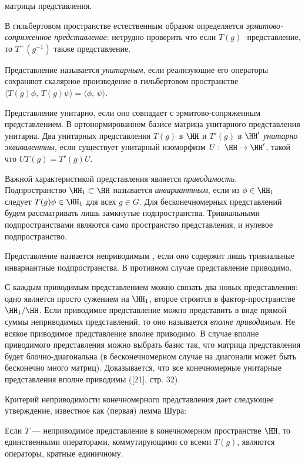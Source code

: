 \documentclass[a4paper
]{article}
\begin{document}
матрицы представления.
\par
В гильбертовом пространстве естественным образом определяется {\em
эрмитово-сопряженное представление}: нетрудно проверить что если
$T(g)$ -представление, то $T^+(g^{-1})$ также
представление.\begin{Def} Представление называется {\em унитарным},
если реализующие его операторы сохраняют скалярное произведение в
гильбертовом пространстве $\langle
T(g)\phi,\,T(g)\psi\rangle=\langle\phi,\,\psi\rangle$.\end{Def}
\noindent Представление унитарно, если оно совпадает с
эрмитово-сопряженным представлением. В ортонормированном базисе
матрица унитарного представления унитарна.  Два унитарных
представления $T(g)$ в $\HH$ и $T'(g)$ в $\HH'$ {\em унитарно
эквивалентны}, если существует унитарный изоморфизм $U:\; \HH\to
\HH'$, такой что $UT(g)=T'(g)U$.
\par
Важной характеристикой представления является {\em приводимость}.
Подпространство $\HH_1\subset\HH$ называется {\em инвариантным},
если из $\phi\in \HH_1$ следует $T(g)\phi \in \HH_1$ для всех
$g\in G$. Для бесконечномерных представлений будем рассматривать
лишь замкнутые подпространства. Тривиальными подпространствами
являются само пространство представления, и нулевое
подпространство. \begin{Def} Представление назвается неприводимым
, если оно содержит лишь тривиальные инвариантные подпространства.
В противном случае представление  приводимо.\end{Def} С каждым
приводимым представлением можно связать два новых представления:
одно является просто сужением на $\HH_1$, второе строится в
фактор-пространстве $\HH_1/\HH$. Если приводимое представление
можно представить в виде прямой суммы неприводимых представлений,
то оно называется {\em вполне приводимым}. Не всякое приводимое
представление вполне приводимо. В случае вполне приводимого
представления можно выбрать базис так, что матрица представления
будет блочно-диагональна (в бесконечномерном случае на диагонали
может быть бесконечно много матриц). Доказывается, что все
конечномерные унитарные представления вполне приводимы ([21], стр.
32).
\par
 Критерий неприводимости конечномерного представления дает
 следующее утверждение, известное как (первая) лемма Шура:
\begin{Trm} Если $T$ --- неприводимое представление в конечномерном
пространстве $\HH$, то единственными операторами, коммутирующими
со всеми $T(g)$, являются операторы, кратные единичному.
\end{Trm}
\end{document}

